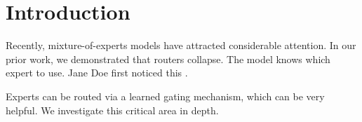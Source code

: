 \section{Introduction}
Recently, mixture-of-experts models have attracted considerable attention. In our prior work, we demonstrated that routers collapse. The model knows which expert to use. Jane Doe first noticed this \cite{shazeer2017}.

Experts can be routed via a learned gating mechanism, which can be very helpful. We investigate this critical area in depth.
